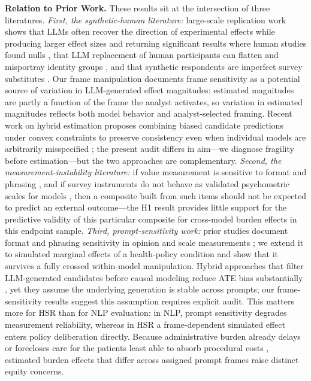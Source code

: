 \documentclass[12pt,a4paper]{article}
\begin{document}
\textbf{Relation to Prior Work.} These results sit at the intersection of three literatures. \emph{First, the synthetic-human literature:} large-scale replication work shows that LLMs often recover the direction of experimental effects while producing larger effect sizes and returning significant results where human studies found nulls \citep{Cui2025replication}, that LLM replacement of human participants can flatten and misportray identity groups \citep{Wang2025identity}, and that synthetic respondents are imperfect survey substitutes \citep{bisbee2024synthetic}. Our frame manipulation documents frame sensitivity as a potential source of variation in LLM-generated effect magnitudes: estimated magnitudes are partly a function of the frame the analyst activates, so variation in estimated magnitudes reflects both model behavior and analyst-selected framing. Recent work on hybrid estimation proposes combining biased candidate predictions under convex constraints to preserve consistency even when individual models are arbitrarily misspecified \citep{DeBartolomeis2025haipw}; the present audit differs in aim---we diagnose fragility before estimation---but the two approaches are complementary. \emph{Second, the measurement-instability literature:} if value measurement is sensitive to format and phrasing \citep{Rottger2024,Tjuatja2024}, and if survey instruments do not behave as validated psychometric scales for models \citep{Miotto2023,Li2025}, then a composite built from such items should not be expected to predict an external outcome---the H1 result provides little support for the predictive validity of this particular composite for cross-model burden effects in this endpoint sample. \emph{Third, prompt-sensitivity work:} prior studies document format and phrasing sensitivity in opinion and scale measurements \citep{Wright2024,Tjuatja2024,Faulborn2025,Kamal2025}; we extend it to simulated marginal effects of a health-policy condition and show that it survives a fully crossed within-model manipulation. Hybrid approaches that filter LLM-generated candidates before causal modeling reduce ATE bias substantially \citep{Dahabreh2025hybrid}, yet they assume the underlying generation is stable across prompts; our frame-sensitivity results suggest this assumption requires explicit audit. This matters more for HSR than for NLP evaluation: in NLP, prompt sensitivity degrades measurement reliability, whereas in HSR a frame-dependent simulated effect enters policy deliberation directly. Because administrative burden already delays or forecloses care for the patients least able to absorb procedural costs \citep{Kyle2021,Shin2025,Shafer2025}, estimated burden effects that differ across assigned prompt frames raise distinct equity concerns.
\end{document}
